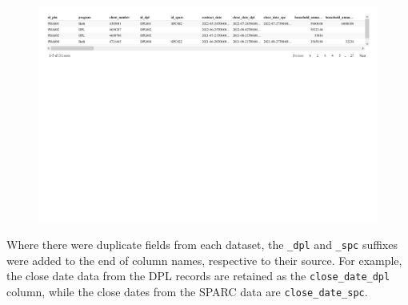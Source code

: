 \documentclass[
  letterpaper,
  DIV=11,
  numbers=noendperiod]{scrartcl}
\begin{document}
\begin{figure}[H]

{\centering \includegraphics{piedmont_files/figure-pdf/dpl-table-1.pdf}

}

\end{figure}

Where there were duplicate fields from each dataset, the \texttt{\_dpl}
and \texttt{\_spc} suffixes were added to the end of column names,
respective to their source. For example, the close date data from the
DPL records are retained as the \texttt{close\_date\_dpl} column, while
the close dates from the SPARC data are \texttt{close\_date\_spc}.
\end{document}
